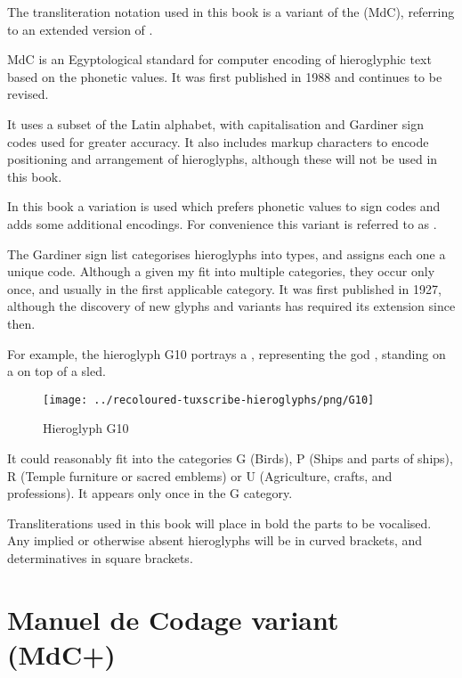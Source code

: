 The transliteration notation used in this book is a variant of the \textit{} (MdC), referring to an extended version of \textit{}.

MdC is an Egyptological standard for computer encoding of hieroglyphic text based on the phonetic values. It was first published in 1988 and continues to be revised.

It uses a subset of the Latin alphabet, with capitalisation and Gardiner sign codes used for greater accuracy. It also includes markup characters to encode positioning and arrangement of hieroglyphs, although these will not be used in this book.

In this book a variation is used which prefers phonetic values to sign codes and adds some additional encodings. For convenience this variant is referred to as .

The Gardiner sign list categorises hieroglyphs into types, and assigns each one a unique code. Although a given  my fit into multiple categories, they occur only once, and usually in the first applicable category. It was first published in 1927, although the discovery of new glyphs and variants has required its extension since then.

For example, the hieroglyph G10 portrays a , representing the god , standing on a  on top of a sled.

\begin{figure} [H]
\centering
\texttt{[image: ../recoloured-tuxscribe-hieroglyphs/png/G10]}
\caption{Hieroglyph G10}
\end{figure}

It could reasonably fit into the categories G (Birds), P (Ships and parts of ships), R (Temple furniture or sacred emblems) or U (Agriculture, crafts, and professions). It appears only once in the G category.

Transliterations used in this book will place in bold the parts to be vocalised. Any implied or otherwise absent hieroglyphs will be in curved brackets, and determinatives in square brackets.

\pagebreak

\section*{Manuel de Codage variant (MdC+)}

